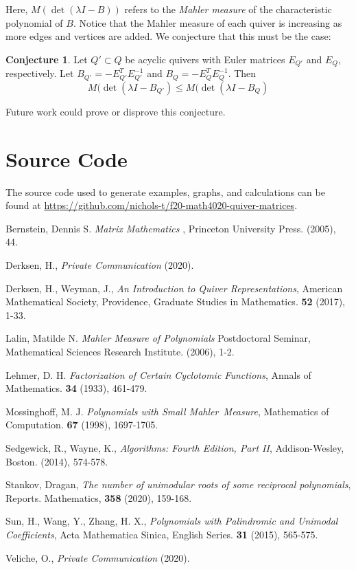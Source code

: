 \documentclass{amsart}
\theoremstyle{theorem}
\theoremstyle{theorem*}
\theoremstyle{definition}
\newtheorem{conjecture}[theorem]{Conjecture}
\begin{document}
Here, $M(\det(\lambda I - B))$ refers to the \textit{Mahler measure} \cite{m} of the
characteristic polynomial of $B$.
Notice that the Mahler measure of each quiver is increasing as more edges and vertices
are added. We conjecture that this must be the case:

\begin{conjecture}
    Let $Q' \subset Q$ be acyclic quivers with Euler matrices $E_{Q'}$ and
    $E_Q$, respectively. Let $B_{Q'} = -E_{Q'}^T E_{Q'}^{-1}$ and 
    $B_Q = - E_Q^T E_Q^{-1}$. Then $$M(\det(\lambda I - B_{Q'}) \leq
    M(\det(\lambda I - B_{Q})$$
\end{conjecture}

Future work could prove or disprove this conjecture.

\appendix
\section{Source Code}
\label{appsec:source}

The source code used to generate examples, graphs, and calculations can
be found at
\textcolor{blue}{\url{https://github.com/nichols-t/f20-math4020-quiver-matrices}}.
\pagebreak
\begin{thebibliography}{99}
    
     Bernstein, Dennis S. {\em Matrix Mathematics \/},
    Princeton University Press. (2005), 44.

     Derksen, H., {\em Private Communication} (2020).
    
     Derksen, H., Weyman, J., {\em An Introduction to Quiver
    Representations\/}, American Mathematical Society, Providence,
    Graduate Studies in Mathematics. {\bf 52} (2017), 1-33.
    
     Lalin, Matilde N. {\em Mahler Measure of Polynomials\/}
    Postdoctoral Seminar, Mathematical Sciences Research Institute. (2006), 1-2.
    
     Lehmer, D. H. {\em Factorization of Certain Cyclotomic
    Functions\/}, Annals of Mathematics. {\bf 34} (1933), 461-479.
    
     Mossinghoff, M. J. {\em Polynomials with Small Mahler\
    Measure\/}, Mathematics of Computation. {\bf 67} (1998), 1697-1705.
            
     Sedgewick, R., Wayne, K., {\em Algorithms: Fourth Edition,
    Part II\/}, Addison-Wesley, Boston. (2014), 574-578.

     Stankov, Dragan, {\em The number of unimodular roots of some
    reciprocal polynomials}, Reports. Mathematics, {\bf 358} (2020), 159-168.
            
     Sun, H., Wang, Y., Zhang, H. X., {\em Polynomials with
    Palindromic and Unimodal Coefficients}, Acta Mathematica Sinica,
    English Series. {\bf 31} (2015), 565-575.

     Veliche, O., {\em Private Communication} (2020).


\end{thebibliography}
\end{document}
